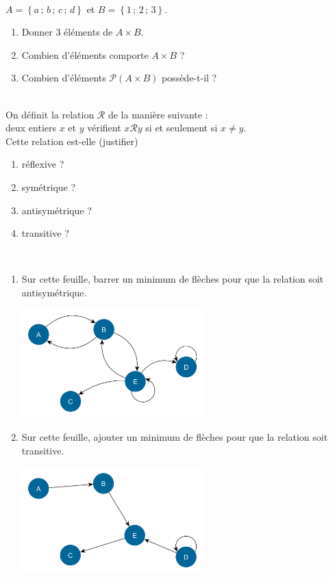 \documentclass[a4paper,12pt,french]{article}
\begin{document}


\exo{}\\

$A=\left\lbrace a\,;\,b\,;\,c\,;\,d\right\rbrace$ et $B=\left\lbrace 1\,;\,2\,;\,3\right\rbrace$.
\begin{enumerate}[\bfseries 1.]
	\item 	Donner 3 éléments de $A\times B$.
	\item 	Combien d'éléments comporte $A\times B$ ?
    \item 	Combien d'éléments $\mathcal{P}(A\times B)$ possède-t-il ?\\
\end{enumerate}


\exo{}\\

On définit la relation $\mathcal{R}$ de la manière suivante :\\ deux entiers $x$ et $y$ vérifient $x\mathcal{R}y$ si et seulement si $x\neq y$.\\

Cette relation est-elle (justifier)
\begin{enumerate}[\bfseries 1.]
	\item 	réflexive ?
	\item 	symétrique ?
    \item 	antisymétrique ?
    \item 	transitive ?\\
\end{enumerate}
\exo{}\\

\begin{enumerate}[\bfseries 1.]
	\item 	Sur cette feuille, barrer un minimum de flèches pour que la relation soit antisymétrique.
            \begin{center}
            \includegraphics[width=7cm]{img/2antisym}
            \end{center}
	\item 	Sur cette feuille, ajouter un minimum de flèches pour que la relation soit transitive.
            \begin{center}
            \includegraphics[width=7cm]{img/2trans}
            \end{center}
\end{enumerate}
\end{document}
